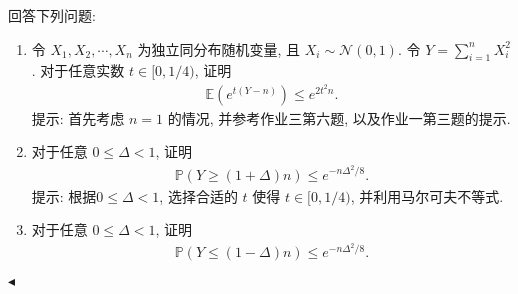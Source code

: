 \documentclass[11pt]{article}
\newenvironment{problem}[2][Problem]{\begin{trivlist}
    \item[\hskip \labelsep {\bfseries #1}\hskip \labelsep {\bfseries #2.}]\songti}{\hfill$\blacktriangleleft$\end{trivlist}}
\newcommand\1{\mathds{1}}
\newcommand\E{\mathbb{E}}
\newcommand\PP{\mathbb{P}}
\begin{document}
\begin{problem}{4}
    回答下列问题:
    \begin{enumerate}[label = (\arabic*)]
        \item 令 $X_1, X_2, \cdots, X_n$ 为独立同分布随机变量, 且 $X_i \sim \mathcal{N}(0,1)$. 令 $Y = \sum_{i=1}^{n}X_i^2$. 对于任意实数 $t\in [0, 1/4)$, 证明
        \begin{align*}
            \E\left(e^{t(Y-n)}\right) \le e^{2t^2n}.
        \end{align*}
        {\kaishu 提示: 首先考虑 $n=1$ 的情况, 并参考作业三第六题, 以及作业一第三题的提示.}
        \item 对于任意 $0\le \Delta < 1$, 证明 
        \begin{align*}
            \PP(Y \ge (1+\Delta)n) \le e^{-n\Delta^2/8}.
        \end{align*}
        {\kaishu 提示: 根据$0\le \Delta < 1$, 选择合适的 $t$ 使得 $t\in [0,1/4)$, 并利用马尔可夫不等式.}
        \item 对于任意 $0\le \Delta < 1$, 证明
        \begin{align*}
            \PP(Y \le (1-\Delta)n) \le e^{-n\Delta^2/8}.
        \end{align*}
    \end{enumerate}
\end{problem}
\end{document}
